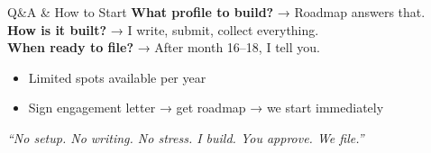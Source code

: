 \documentclass[aspectratio=169, 10pt]{beamer}
\begin{document}
	\begin{frame}{Q\&A \& How to Start}
		\centering
		\textbf{\Large What profile to build?} → Roadmap answers that. \\
		\textbf{\Large How is it built?} → I write, submit, collect everything. \\
		\textbf{\Large When ready to file?} → After month 16–18, I tell you.
		
		\vspace{0.5cm}
		\begin{itemize}
			\item Limited spots available per year
			\item Sign engagement letter → get roadmap → we start immediately
		\end{itemize}
		
		\vspace{0.3cm}
		\textit{“No setup. No writing. No stress. I build. You approve. We file.”}
	\end{frame}
	
\end{document}
